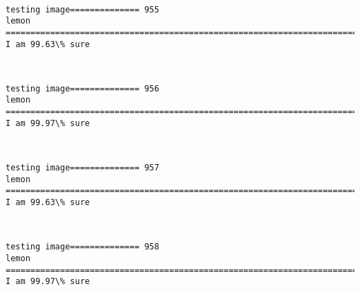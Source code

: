 \documentclass[11pt]{article}
\begin{document}
    \begin{center}
    \end{center}
    { \hspace*{\fill} \\}
    
    \begin{Verbatim}[commandchars=\\\{\}]
testing image============== 955
lemon
============================================================================
I am 99.63\% sure

    \end{Verbatim}

    \begin{center}
    \end{center}
    { \hspace*{\fill} \\}
    
    \begin{Verbatim}[commandchars=\\\{\}]
testing image============== 956
lemon
============================================================================
I am 99.97\% sure

    \end{Verbatim}

    \begin{center}
    \end{center}
    { \hspace*{\fill} \\}
    
    \begin{Verbatim}[commandchars=\\\{\}]
testing image============== 957
lemon
============================================================================
I am 99.63\% sure

    \end{Verbatim}

    \begin{center}
    \end{center}
    { \hspace*{\fill} \\}
    
    \begin{Verbatim}[commandchars=\\\{\}]
testing image============== 958
lemon
============================================================================
I am 99.97\% sure

    \end{Verbatim}
\end{document}
